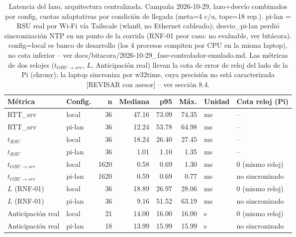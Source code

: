 \begin{table}[H]
\centering
\caption{Latencia del lazo, arquitectura centralizada. Campaña 2026-10-29, lazo+desvío combinados por config, cuotas adaptativas por condición de llegada (meta=4 c/u, tope=18 rep.). pi-lan = RSU real por Wi-Fi vía Tailscale (wlan0, no Ethernet cableado); desvio_pi-lan perdió sincronización NTP en un punto de la corrida (RNF-01 peor caso: no evaluable, ver bitácora). config=local es banco de desarrollo (los 4 procesos compiten por CPU en la misma laptop), no cota inferior -- ver docs/bitacora/2026-10-29_fase-controlador-emulado.md. Las métricas de dos relojes ($t_{OBU\to srv}$, $L$, Anticipación real) llevan la cota de error de reloj del lado de la Pi (chrony); la laptop sincroniza por w32time, cuya precisión no está caracterizada [REVISAR con asesor] -- ver sección 8.4.}
\label{tab:latencia_campana_centralizada}
\small
\begin{tabular}{llrrrrll}
\toprule
\textbf{Métrica} & \textbf{Config.} & \textbf{n} & \textbf{Mediana} & \textbf{p95} & \textbf{Máx.} & \textbf{Unidad} & \textbf{Cota reloj (Pi)} \\
\midrule
RTT\_srv & local & 36 & 47.16 & 73.09 & 74.35 & ms & -- \\
RTT\_srv & pi-lan & 36 & 12.24 & 53.78 & 64.98 & ms & -- \\
$t_{RSU}$ & local & 36 & 18.24 & 26.40 & 27.45 & ms & -- \\
$t_{RSU}$ & pi-lan & 36 & 1.01 & 1.10 & 1.35 & ms & -- \\
$t_{OBU\to srv}$ & local & 1620 & 0.58 & 0.69 & 1.30 & ms & 0 (mismo reloj) \\
$t_{OBU\to srv}$ & pi-lan & 1620 & 0.59 & 0.69 & 0.77 & ms & no sincronizado \\
$L$ (RNF-01) & local & 36 & 18.89 & 26.97 & 28.06 & ms & 0 (mismo reloj) \\
$L$ (RNF-01) & pi-lan & 36 & 9.16 & 51.52 & 63.19 & ms & no sincronizado \\
Anticipación real & local & 21 & 14.00 & 16.00 & 16.00 & s & 0 (mismo reloj) \\
Anticipación real & pi-lan & 18 & 13.99 & 15.99 & 15.99 & s & no sincronizado \\
\bottomrule
\end{tabular}
\end{table}
